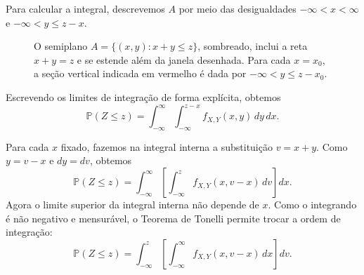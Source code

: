 \documentclass[12pt,portuguese]{article}
\theoremstyle{definition}
\theoremstyle{plainexercise}
\theoremstyle{starredexercise}
\theoremstyle{definition}
\begin{document}
Para calcular a integral, descrevemos $A$ por meio das desigualdades
$-\infty < x < \infty$ e $-\infty < y \leqslant z - x$. 
\begin{figure}[H]
\centering
{}
\caption{O semiplano $A=\{(x,y):x+y\leqslant z\}$, sombreado,
inclui a reta $x+y=z$ e se estende além da janela desenhada. Para cada
$x=x_0$, a seção vertical indicada em vermelho é dada por
$-\infty<y\leqslant z-x_0$.}
\label{fig:semiplano-densidade-soma}
\end{figure}
Escrevendo os limites
de integração de forma explícita, obtemos
\[
  \mathbb{P}(Z \leqslant z)
  = \int_{-\infty}^{\infty} \int_{-\infty}^{z-x} f_{X,Y}(x, y)\,dy\,dx.
\]

Para cada $x$ fixado, fazemos na integral interna a substituição $v=x+y$.
Como $y=v-x$ e $dy=dv$, obtemos
\[
  \mathbb{P}(Z \leqslant z)
  = \int_{-\infty}^{\infty} \left[ \int_{-\infty}^{z} f_{X,Y}(x, v-x)\,dv \right] dx.
\]
Agora o limite superior da integral interna não depende de $x$. Como o
integrando é não negativo e mensurável, o Teorema de Tonelli permite trocar a
ordem de integração:
\[
  \mathbb{P}(Z \leqslant z)
  = \int_{-\infty}^{z} \left[ \int_{-\infty}^{\infty} f_{X,Y}(x, v-x)\,dx \right] dv.
\]
\end{document}
